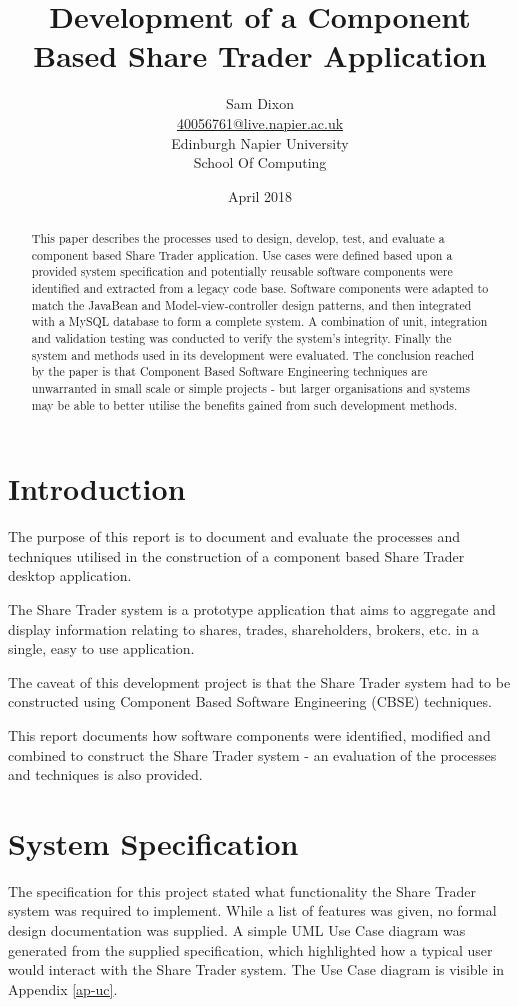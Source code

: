 \documentclass[12pt, a4paper,titlepage]{article}
\title{Development of a Component Based Share Trader Application}
\author{Sam Dixon
        \\\href{mailto:40056761@live.napier.ac.uk}{40056761@live.napier.ac.uk}
        \\Edinburgh Napier University
        \\School Of Computing
        \\}
\date{April 2018}
\begin{document}
\maketitle


\begin{abstract}
\thispagestyle{plain}
This paper describes the processes used to design, develop, test, and evaluate
a component based Share Trader application.
Use cases were defined based upon a provided system specification and
potentially reusable software components were identified and extracted from a
legacy code base.
Software components were adapted to match the JavaBean and
Model-view-controller design patterns, and then integrated with a MySQL
database to form a complete system.
A combination of unit, integration and validation testing was conducted to
verify the system's integrity.
Finally the system and methods used in its development were evaluated.
The conclusion reached by the paper is that Component Based Software
Engineering techniques are unwarranted in small scale or simple projects - but
larger organisations and systems may be able to better utilise the benefits
gained from such development methods.
\end{abstract}


\setcounter{page}{2}
\tableofcontents
\newpage
{}


\section{Introduction}
The purpose of this report is to document and evaluate the processes and
techniques utilised in the construction of a component based Share Trader
desktop application.

The Share Trader system is a prototype application that aims to aggregate and
display information relating to shares, trades, shareholders, brokers, etc. in
a single, easy to use application. 

The caveat of this development project is that the Share Trader system had to
be constructed using Component Based Software Engineering (CBSE) techniques.

This report documents how software components were identified, modified and
combined to construct the Share Trader system - an evaluation of the processes
and techniques is also provided.


\section{System Specification}
The specification for this project stated what functionality the Share Trader
system was required to implement.
While a list of features was given, no formal design documentation was
supplied.
A simple UML Use Case diagram was generated from the supplied specification,
which highlighted how a typical user would interact with the Share Trader
system.
The Use Case diagram is visible in Appendix \ref{ap-uc}.
\end{document}

